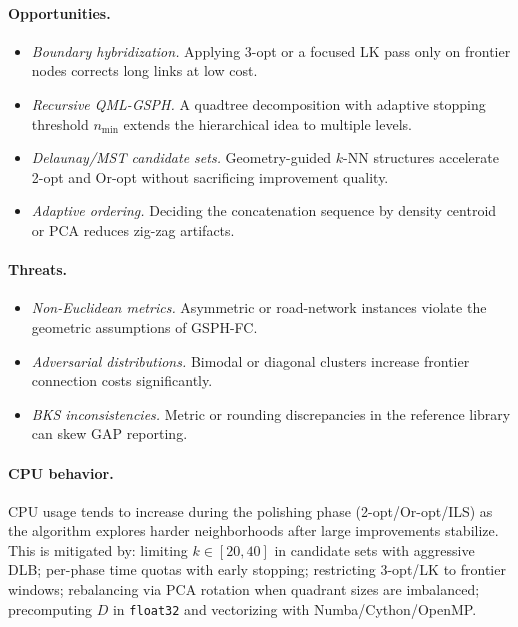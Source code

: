 \documentclass[runningheads]{llncs}
\begin{document}
\paragraph{Opportunities.}
\begin{itemize}
  \item \textit{Boundary hybridization.} Applying 3-opt or a
    focused LK pass only on frontier nodes corrects long links at
    low cost.
  \item \textit{Recursive QML-GSPH.} A quadtree decomposition with
    adaptive stopping threshold $n_{\min}$ extends the hierarchical
    idea to multiple levels.
  \item \textit{Delaunay/MST candidate sets.} Geometry-guided
    $k$-NN structures accelerate 2-opt and Or-opt without
    sacrificing improvement quality.
  \item \textit{Adaptive ordering.} Deciding the concatenation
    sequence by density centroid or PCA reduces zig-zag artifacts.
\end{itemize}

\paragraph{Threats.}
\begin{itemize}
  \item \textit{Non-Euclidean metrics.} Asymmetric or road-network
    instances violate the geometric assumptions of GSPH-FC.
  \item \textit{Adversarial distributions.} Bimodal or diagonal
    clusters increase frontier connection costs significantly.
  \item \textit{BKS inconsistencies.} Metric or rounding
    discrepancies in the reference library can skew GAP reporting.
\end{itemize}

\paragraph{CPU behavior.}
CPU usage tends to increase during the polishing phase
(2-opt/Or-opt/ILS) as the algorithm explores harder neighborhoods
after large improvements stabilize. This is mitigated by: limiting
$k\in[20,40]$ in candidate sets with aggressive DLB; per-phase
time quotas with early stopping; restricting 3-opt/LK to frontier
windows; rebalancing via PCA rotation when quadrant sizes are
imbalanced; precomputing $D$ in \texttt{float32} and vectorizing
with Numba/Cython/OpenMP.
\end{document}
